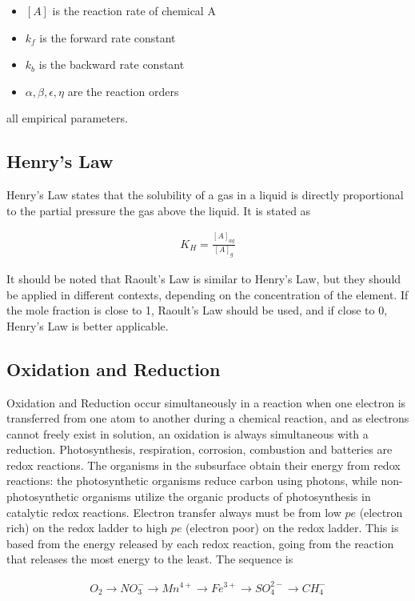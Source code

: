 \documentclass[11pt,twoside]{report}
\begin{document}
\begin{itemize}
   \item $[A]$ is the reaction rate of chemical A
   \item $k_{f}$ is the forward rate constant
   \item $k_{b}$ is the backward rate constant
   \item $\alpha,\beta,\epsilon,\eta$ are the reaction orders
\end{itemize}
all empirical parameters. 

\subsection{Henry's Law}
Henry's Law states that the solubility of a gas in a liquid is directly proportional to the partial pressure the gas above the liquid. It is stated as 

\begin{align}
   K_{H} = \frac{[A]_{aq}}{[A]_{g}}
\end{align}

It should be noted that Raoult's Law is similar to Henry's Law, but they should be applied in different contexts, depending on the concentration of the element. If the mole fraction is close to 1, Raoult's Law should be used, and if close to 0, Henry's Law is better applicable. 

\subsection{Oxidation and Reduction}
Oxidation and Reduction occur simultaneously in a reaction when one electron is transferred from one atom to another during a chemical reaction, and as electrons cannot freely exist in solution, an oxidation is always simultaneous with a reduction. Photosynthesis, respiration, corrosion, combustion and batteries are redox reactions. The organisms in the subsurface obtain their energy from redox reactions: the photosynthetic organisms reduce carbon using photons, while non-photosynthetic organisms utilize the organic products of photosynthesis in catalytic redox reactions.  Electron transfer always must be from low $pe$ (electron rich) on the redox ladder to high $pe$ (electron poor) on the redox ladder. This is based from the energy released by each redox reaction, going from the reaction that releases the most energy to the least. The sequence is 


\begin{align}
   O_{2} \rightarrow NO_{3}^{-} \rightarrow Mn^{4+} \rightarrow Fe^{3+} \rightarrow SO_{4}^{2-} \rightarrow CH_{4}^{-}
\end{align}
\end{document}
